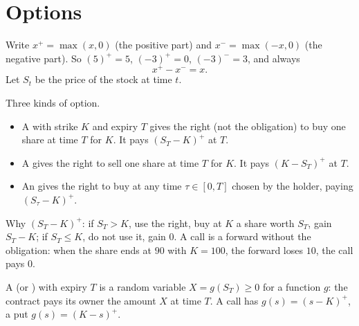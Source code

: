 \section{Options}

Write $x^+=\max(x,0)$ (the positive part) and $x^-=\max(-x,0)$ (the negative part). So $(5)^+=5$, $(-3)^+=0$, $(-3)^-=3$, and always
\[
  x^+-x^-=x .
\]
Let $S_t$ be the price of the stock at time $t$.

\begin{definition}
\label{def:call-put}
Three kinds of option.
\begin{itemize}
  \item A  with strike $K$ and expiry $T$ gives the right (not the obligation) to buy one share at time $T$ for $K$. It pays $(S_T-K)^+$ at $T$.
  \item A  gives the right to sell one share at time $T$ for $K$. It pays $(K-S_T)^+$ at $T$.
  \item An  gives the right to buy at any time $\tau\in[0,T]$ chosen by the holder, paying $(S_\tau-K)^+$.
\end{itemize}
\end{definition}

Why $(S_T-K)^+$: if $S_T>K$, use the right, buy at $K$ a share worth $S_T$, gain $S_T-K$; if $S_T\le K$, do not use it, gain $0$. A call is a forward without the obligation: when the share ends at $90$ with $K=100$, the forward loses $10$, the call pays $0$.

\begin{definition}
\label{def:claim}
A  (or ) with expiry $T$ is a random variable $X=g(S_T)\ge0$ for a function $g$: the contract pays its owner the amount $X$ at time $T$. A call has $g(s)=(s-K)^+$, a put $g(s)=(K-s)^+$.
\end{definition}

\begin{pic}
\end{pic}

